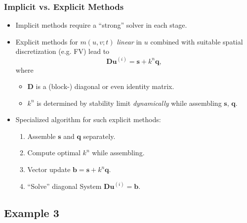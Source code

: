 \begin{frame}
\frametitle{Implicit vs. Explicit Methods}
\begin{itemize}
\item Implicit methods require a ``strong'' solver in each stage.
\item Explicit methods for $m(u,v;t)$ \textit{linear} in $u$ combined with
suitable spatial discretization (e.g. FV) lead to
\begin{equation*}
\mathbf{D} \mathbf{u}^{(i)} = \mathbf{s} + k^n \mathbf{q},
\end{equation*} 
where 
\begin{itemize}
\item $\mathbf{D}$ is a (block-) diagonal or even identity matrix.
\item $k^n$ is determined by stability limit \textit{dynamically} while 
assembling $\mathbf{s}$, $\mathbf{q}$.
\end{itemize}
\item Specialized algorithm for such explicit methods:
\begin{enumerate}
\item Assemble $\mathbf{s}$ and $\mathbf{q}$ separately.
\item Compute optimal $k^n$ while assembling.
\item Vector update $\mathbf{b} = \mathbf{s} + k^n \mathbf{q}$.
\item ``Solve'' diagonal System $\mathbf{D} \mathbf{u}^{(i)} = \mathbf{b}$.
\end{enumerate}
\end{itemize}
\end{frame}


\subsection{Example 3}


